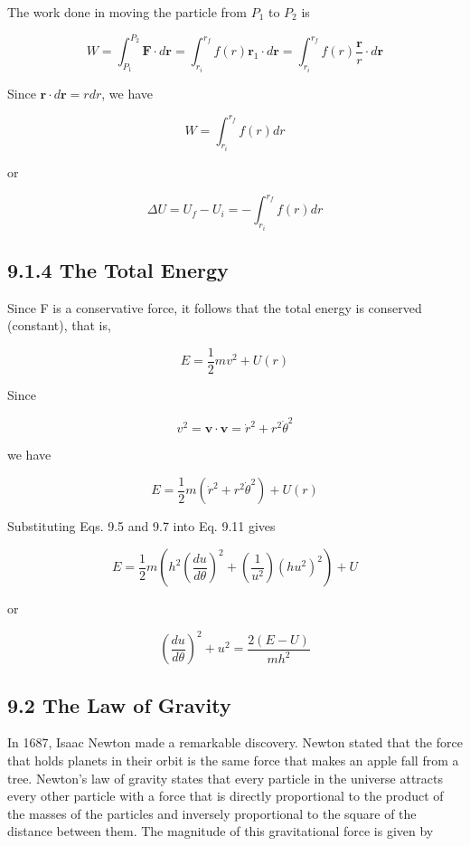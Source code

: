\documentclass[10pt]{article}
\begin{document}
The work done in moving the particle from $P_{1}$ to $P_{2}$ is

$$
W=\int_{P_{1}}^{P_{2}} \mathbf{F} \cdot d \mathbf{r}=\int_{r_{i}}^{r_{f}} f(r) \mathbf{r}_{1} \cdot d \mathbf{r}=\int_{r_{i}}^{r_{f}} f(r) \frac{\mathbf{r}}{r} \cdot d \mathbf{r}
$$

Since $\mathbf{r} \cdot d \mathbf{r}=r d r$, we have

$$
W=\int_{r_{i}}^{r_{f}} f(r) d r
$$

or


\begin{equation*}
\Delta U=U_{f}-U_{i}=-\int_{r_{i}}^{r_{f}} f(r) d r \tag{9.10}
\end{equation*}


\subsection*{9.1.4 The Total Energy}
Since F is a conservative force, it follows that the total energy is conserved (constant), that is,

$$
E=\frac{1}{2} m v^{2}+U(r)
$$

Since

$$
v^{2}=\mathbf{v} \cdot \mathbf{v}=\dot{r}^{2}+r^{2} \dot{\theta}^{2}
$$

we have


\begin{equation*}
E=\frac{1}{2} m\left(\dot{r}^{2}+r^{2} \dot{\theta}^{2}\right)+U(r) \tag{9.11}
\end{equation*}


Substituting Eqs. 9.5 and 9.7 into Eq. 9.11 gives

$$
E=\frac{1}{2} m\left(h^{2}\left(\frac{d u}{d \theta}\right)^{2}+\left(\frac{1}{u^{2}}\right)\left(h u^{2}\right)^{2}\right)+U
$$

or


\begin{equation*}
\left(\frac{d u}{d \theta}\right)^{2}+u^{2}=\frac{2(E-U)}{m h^{2}} \tag{9.12}
\end{equation*}


\subsection*{9.2 The Law of Gravity}
In 1687, Isaac Newton made a remarkable discovery. Newton stated that the force that holds planets in their orbit is the same force that makes an apple fall from a tree. Newton's law of gravity states that every particle in the universe attracts every other particle with a force that is directly proportional to the product of the masses of the particles and inversely proportional to the square of the distance between them. The magnitude of this gravitational force is given by
\end{document}
